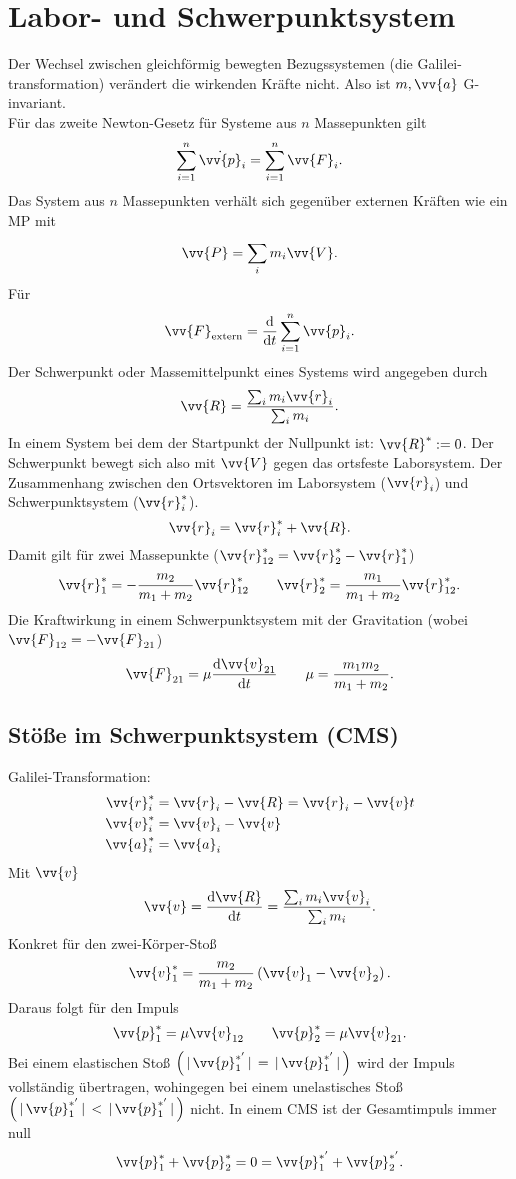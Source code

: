 \documentclass[a4paper,12pt]{article}
\numberwithin{equation}{section}
\begin{document}
\section{Labor- und Schwerpunktsystem}
Der Wechsel zwischen gleichförmig bewegten Bezugssystemen (die Galilei-transformation) verändert die wirkenden Kräfte nicht. Also ist $m,\vv{a}$ G-invariant.\\
Für das zweite Newton-Gesetz für Systeme aus $n$ Massepunkten gilt 
\[ 
        \sum_{i=1}^{n}\dot{\vv{p}}_i=\sum_{i=1}^{n}\vv{F}_i
.\] 
Das System aus $n$ Massepunkten verhält sich gegenüber externen Kräften wie ein MP mit
\[ 
        \vv{P}=\sum_{i}^{}m_i\vv{V}
.\] 
Für 
\[ 
        \vv{F}_{\text{extern}}=\dfrac{\text{d}}{\text{d}t}\sum_{i=1}^{n}\vv{p}_i
.\] 
Der Schwerpunkt oder Massemittelpunkt eines Systems wird angegeben durch
\[ 
        \vv{R}=\dfrac{\sum_{i}^{}m_i\vv{r}_i}{\sum_{i}^{}m_i}
.\] 
In einem System bei dem der Startpunkt der Nullpunkt ist: $\vv{R}^{*}:=0$. Der Schwerpunkt bewegt sich also mit $\vv{V}$ gegen das ortsfeste Laborsystem. Der Zusammenhang zwischen den Ortsvektoren im Laborsystem ($\vv{r}_i$) und Schwerpunktsystem ($\vv{r}^{*}_i$).
\[ 
        \vv{r}_i=\vv{r}^{*}_i+\vv{R}
.\] 
Damit gilt für zwei Massepunkte ($\vv{r}_{12}^{*}=\vv{r}_2^{*}-\vv{r}_1^{*}$)
\[ 
        \vv{r}_1^{*}=-\dfrac{m_2}{m_1+m_2}\vv{r}^{*}_{12}\qquad \vv{r}_2^{*}=\dfrac{m_1}{m_1+m_2}\vv{r}_{12}^{*}
.\] 
Die Kraftwirkung in einem Schwerpunktsystem mit der Gravitation (wobei $\vv{F}_{12}=-\vv{F}_{21}$)
\[ 
        \vv{F}_{21}=\mu \dfrac{\text{d}\vv{v}_{21}}{\text{d}t}\qquad \mu =\dfrac{m_1m_2}{m_1+m_2}
.\] 

\subsection{Stöße im Schwerpunktsystem (CMS)}
Galilei-Transformation:
\begin{align*}
        \vv{r}_i^{*}&=\vv{r}_i-\vv{R}=\vv{r}_i-\vv{v}t\\
        \vv{v}_i^{*}&=\vv{v}_i-\vv{v}\\
        \vv{a}_i^{*}&=\vv{a}_i
\end{align*}
Mit $\vv{v}$ 
\[ 
        \vv{v}=\dfrac{\text{d}\vv{R}}{\text{d}t}=\dfrac{\sum_{i}^{}m_i\vv{v}_i}{\sum_{i}^{}m_i}
.\]
Konkret für den zwei-Körper-Stoß
\[ 
        \vv{v}_1^{*}=\dfrac{m_2}{m_1+m_2}\left(\vv{v}_1-\vv{v}_2\right)
.\] 
Daraus folgt für den Impuls
\[ 
        \vv{p}_1^{*}=\mu \vv{v}_{12}\qquad \vv{p}_2^{*}=\mu \vv{v}_{21}
.\] 
Bei einem elastischen Stoß $\left(\,|\, \vv{p}_1^{*'}\,|\, =\,|\, \vv{p}_1^{*'}\,|\, \right)$ wird der Impuls vollständig übertragen, wohingegen bei einem unelastisches Stoß $\left(\,|\, \vv{p}_1^{*'}\,|\, <\,|\, \vv{p}_1^{*'}\,|\, \right)$ nicht. In einem CMS ist der Gesamtimpuls immer null
\[ 
        \vv{p}_1^{*}+\vv{p}_2^{*}=0=\vv{p}_1^{*'}+\vv{p}_2^{*'}
.\] 
\end{document}
